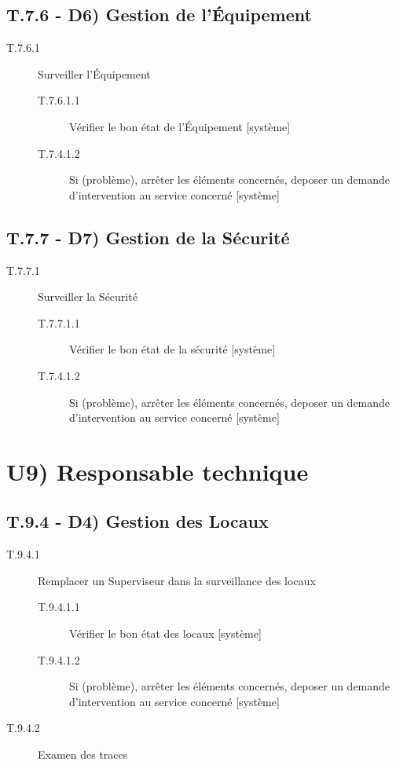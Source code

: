 	\subsection{T.7.6 - D6) Gestion de l'Équipement}
	\begin{description}
	\item[T.7.6.1] Surveiller l'Équipement
		\begin{description}
		\item[T.7.6.1.1] Vérifier le bon état de l'Équipement [système]
		\item[T.7.4.1.2] Si (problème), arrêter les éléments concernés, deposer un
		demande d'intervention au service concerné [système]
		\end{description}
	\end{description}

	\subsection{T.7.7 - D7) Gestion de la Sécurité}
	\begin{description}
	\item[T.7.7.1] Surveiller la Sécurité
		\begin{description}
		\item[T.7.7.1.1] Vérifier le bon état de la sécurité [système]
		\item[T.7.4.1.2] Si (problème), arrêter les éléments concernés, deposer un
		demande d'intervention au service concerné [système]
		\end{description}
	\end{description}

\section{U9) Responsable technique}
	\subsection{T.9.4 - D4) Gestion des Locaux}
	\begin{description}
	\item[T.9.4.1] Remplacer un Superviseur dans la surveillance des locaux
		\begin{description}
		\item[T.9.4.1.1] Vérifier le bon état des locaux [système]
		\item[T.9.4.1.2] Si (problème), arrêter les éléments concernés, deposer un
		demande d'intervention au service concerné [système]
		\end{description}
	\item[T.9.4.2] Examen des traces
	\end{description}
	
